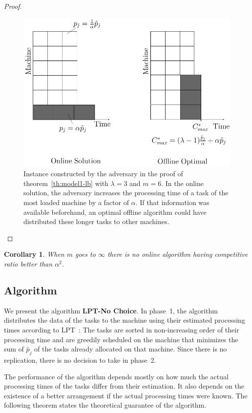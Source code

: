 \documentclass[10pt, conference, compsocconf]{IEEEtran}
\newtheorem{corollary}{Corollary}[theorem]
\begin{document}
\begin{proof}
  \begin{figure}[htp]
  \centering
  \includegraphics[width= 8 cm]{model1.pdf}
  \caption{Instance constructed by the adversary in the proof of
    theorem~\ref{th:model1-lb} with $\lambda = 3$ and $m = 6$. In the
    online solution, the adversary increases 
    the processing time of a task of the most loaded machine by a factor of $\alpha$. If
    that information was available beforehand, an optimal offline
    algorithm could have distributed these longer tasks to other
    machines.}
  \label{fig:rara}
  \end{figure}
\end{proof}    
  
  
  \begin{corollary}
  When $m$ goes to $\infty$ there is no online algorithm having competitive ratio better than $\alpha^{2}$.
  \end{corollary}
  
\subsection{Algorithm}

We present the algorithm \textbf{LPT-No Choice}. In phase~1, the
algorithm distributes the data of the tasks to the machine using
their estimated processing times according to 
LPT~\cite{Graham69boundson}: The tasks are sorted in non-increasing
order of their processing time and are greedily scheduled on the
machine that minimizes the sum of $\tilde{p_j}$ of the tasks
already allocated on that machine. Since there is no replication, there is
no decision to take in phase~2.

The performance of the algorithm depends mostly on how much the actual
processing times of the tasks differ from their estimation. It also depends on the
existence of a better arrangement if the actual processing times were
known. The following theorem states the theoretical guarantee of the
algorithm.
\end{document}
